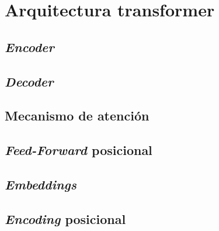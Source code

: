 \section{Arquitectura transformer}
\subsection{\textit{Encoder}}
\subsection{\textit{Decoder}}
\subsection{Mecanismo de atención}
\subsection{\textit{Feed-Forward} posicional}
\subsection{\textit{Embeddings}}
\subsection{\textit{Encoding} posicional}
